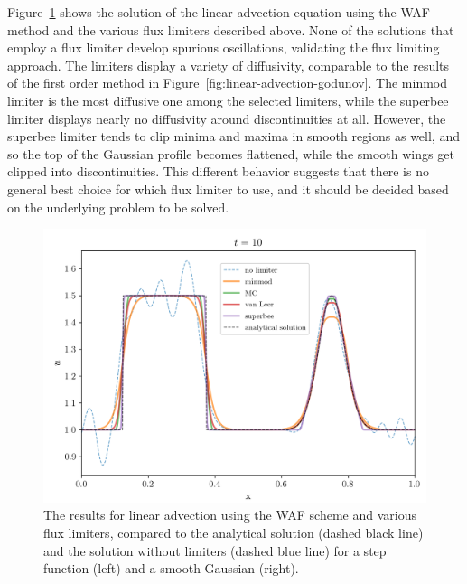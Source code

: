 Figure~\ref{fig:advection-WAF-solution} shows the solution of the linear advection equation using
the WAF method and the various flux limiters described above. None of the solutions that employ a
flux limiter develop spurious oscillations, validating the flux limiting approach. The limiters
display a variety of diffusivity, comparable to the results of the first order method in
Figure~\ref{fig:linear-advection-godunov}. The minmod limiter is the most diffusive one among the
selected limiters, while the superbee limiter displays nearly no diffusivity around discontinuities
at all. However, the superbee limiter tends to clip minima and maxima in smooth regions as well,
and so the top of the Gaussian profile becomes flattened, while the smooth wings get clipped into
discontinuities. This different behavior suggests that there is no general best choice for which
flux limiter to use, and it should be decided based on the underlying problem to be solved.



\begin{figure}
    \centering
\includegraphics[width=.7\textwidth]{figures/FV/advection_WAF/limiter_comparison-WAF-two-shapes.png}
    \caption[WAF scheme for linear advection with limiters]{
The results for linear advection using the WAF scheme and various flux limiters, compared to the
analytical solution (dashed black line) and the solution without limiters (dashed blue line) for a
step function (left) and a smooth Gaussian (right).
    }
    \label{fig:advection-WAF-solution}
\end{figure}



